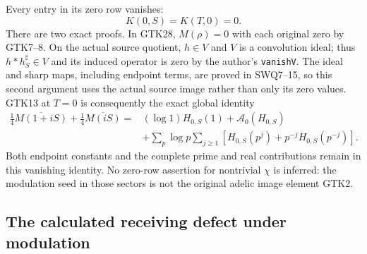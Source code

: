 Every entry in its zero row vanishes:
\begin{equation}\tag{GTK30}
 K(0,S)=K(T,0)=0 .
\end{equation}
There are two exact proofs. In GTK28, $M(\rho)=0$
with each original zero by GTK7--8. On the actual
source quotient, $h\in V$ and $V$ is a convolution
ideal; thus $h*h_S^\sharp\in V$ and its induced
operator is zero by the author's \texttt{vanishV}.
The ideal and sharp maps, including endpoint terms,
are proved in SWQ7--15, so this second argument uses
the actual source image rather than only its zero
values. GTK13 at $T=0$ is consequently the exact
global identity
\begin{equation}\tag{GTK31}
 \begin{split}
 \tfrac14\overline{M(1+iS)}
       +\tfrac14\overline{M(iS)}
 ={}&(\log1)H_{0,S}(1)+\mathcal A_0(H_{0,S})\\
 &+\sum_p\log p\sum_{j\ge1}
       [H_{0,S}(p^j)+p^{-j}H_{0,S}(p^{-j})].
 \end{split}
\end{equation}
Both endpoint constants and the complete prime and
real contributions remain in this vanishing identity.
No zero-row assertion for nontrivial $\chi$ is inferred:
the modulation seed in those sectors is not the
original adelic image element GTK2.

\subsection{The calculated receiving defect under modulation}

